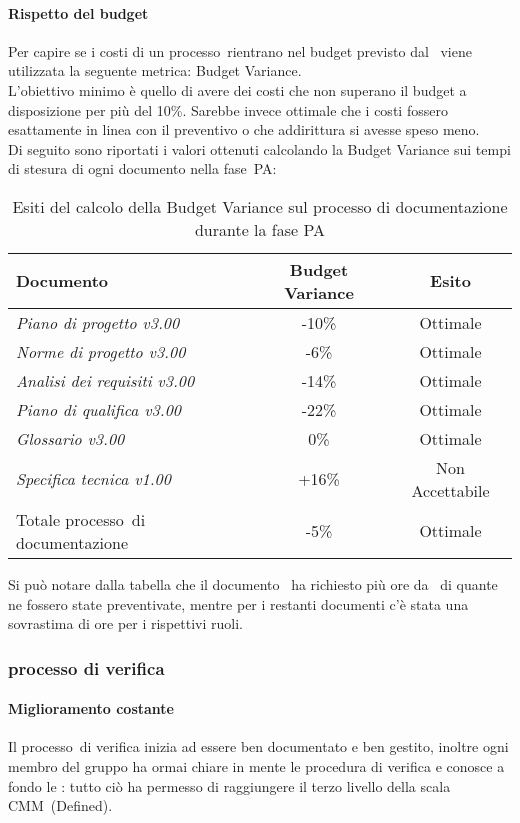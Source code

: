 \documentclass[../PianoDiQualifica.tex]{subfiles}
\begin{document}
\begin{appendices}
			\paragraph{Rispetto del budget}
			Per capire se i costi di un processo\g\ rientrano nel budget previsto dal \pianodiprogetto\ viene utilizzata la seguente metrica: Budget Variance.\\
			L'obiettivo minimo è quello di avere dei costi che non superano il budget a disposizione per più del 10\%. Sarebbe invece ottimale che i costi fossero esattamente in linea con il preventivo o che addirittura si avesse speso meno.\\
			Di seguito sono riportati i valori ottenuti calcolando la Budget Variance sui tempi di stesura di ogni documento nella fase\g\ PA:
			\begin{table}[H]
				\centering
				\begin{tabular}{l * {2}{c}}
					\toprule
					\textbf{Documento} & \textbf{Budget Variance} & \textbf{Esito} \\
					\midrule
					\textit{Piano di progetto v3.00} & -10\% &  Ottimale \\
					\textit{Norme di progetto v3.00} & -6\% & Ottimale \\
					\textit{Analisi dei requisiti v3.00} & -14\% & Ottimale \\
					\textit{Piano di qualifica v3.00} & -22\% & Ottimale \\
					\textit{Glossario v3.00} & 0\% & Ottimale \\
					\textit{Specifica tecnica v1.00} & +16\% & Non Accettabile \\
					Totale processo\g\ di documentazione & -5\% & Ottimale \\
					\bottomrule
				\end{tabular}
				\caption{Esiti del calcolo della Budget Variance sul processo di documentazione durante la fase PA}
				\label{tab:esiti_budget_variance}
			\end{table}
			 Si può notare dalla tabella che il documento \specificatecnica\ ha richiesto più ore da \progettista\ di quante ne fossero state preventivate, mentre per i restanti documenti c'è stata una sovrastima di ore per i rispettivi ruoli.
						
		\subsubsection{processo di verifica}
			\paragraph{Miglioramento costante}
			Il processo\g\ di verifica inizia ad essere ben documentato e ben gestito, inoltre ogni membro del gruppo ha ormai chiare in mente le procedura di verifica e conosce a fondo le \normediprogetto: tutto ciò ha permesso di raggiungere il terzo livello della scala CMM\g\ (Defined).
			

\end{appendices}
\end{document}
